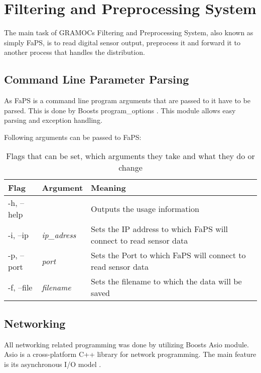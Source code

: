 \chapter{Filtering and Preprocessing System}
\label{ch:faps}

\author{Nico Kratky}
%
The main task of GRAMOCs Filtering and Preprocessing System, also known as simply FaPS, is to read digital sensor output, preprocess it and forward it to another process that handles the distribution.

\section{Command Line Parameter Parsing}

As FaPS is a command line program arguments that are passed to it have to be parsed. This is done by Boosts program\_options \cite{BoostProgramOptions}. This module allows easy parsing and exception handling.

Following arguments can be passed to FaPS:

\begin{table}[H]
    \centering
    \begin{tabular}{| l | l | p{5cm} |}
    \hline
    \textbf{Flag} & \textbf{Argument} & \textbf{Meaning} \\ \hline
    -h, --help & & Outputs the usage information \\ \hline
    -i, --ip & \textit{ip\_adress} & Sets the IP address to which FaPS will connect to read sensor data \\ \hline
    -p, --port & \textit{port} & Sets the Port to which FaPS will connect to read sensor data \\ \hline
    -f, --file & \textit{filename} & Sets the filename to which the data will be saved \\
    \hline
    \end{tabular}
    \caption{Flags that can be set, which arguments they take and what they do or change}
    \label{tab:faps_arguments}
\end{table}

\section{Networking}

All networking related programming was done by utilizing Boosts Asio module. Asio is a cross-platform C++ library for network programming. The main feature is its asynchronous I/O model \cite{BoostAsio}.

